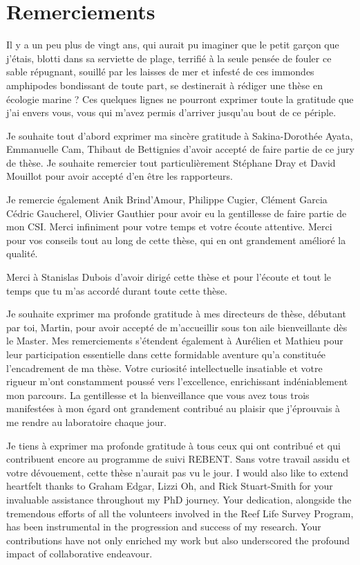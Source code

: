 \begin{refsection}

\hypertarget{remerciements}{%
\chapter*{Remerciements}\label{remerciements}}

Il y a un peu plus de vingt ans, qui aurait pu imaginer que le petit
garçon que j'étais, blotti dans sa serviette de plage, terrifié à la
seule pensée de fouler ce sable répugnant, souillé par les laisses de
mer et infesté de ces immondes amphipodes bondissant de toute part, se
destinerait à rédiger une thèse en écologie marine ? Ces quelques lignes
ne pourront exprimer toute la gratitude que j'ai envers vous, vous qui
m'avez permis d'arriver jusqu'au bout de ce périple.

Je souhaite tout d'abord exprimer ma sincère gratitude à Sakina-Dorothée
Ayata, Emmanuelle Cam, Thibaut de Bettignies d'avoir accepté de faire
partie de ce jury de thèse. Je souhaite remercier tout particulièrement
Stéphane Dray et David Mouillot pour avoir accepté d'en être les
rapporteurs.

Je remercie également Anik Brind'Amour, Philippe Cugier, Clément Garcia
Cédric Gaucherel, Olivier Gauthier pour avoir eu la gentillesse de faire
partie de mon CSI. Merci infiniment pour votre temps et votre écoute
attentive. Merci pour vos conseils tout au long de cette thèse, qui en
ont grandement amélioré la qualité.

Merci à Stanislas Dubois d'avoir dirigé cette thèse et pour l'écoute et
tout le temps que tu m'as accordé durant toute cette thèse.

Je souhaite exprimer ma profonde gratitude à mes directeurs de thèse,
débutant par toi, Martin, pour avoir accepté de m'accueillir sous ton
aile bienveillante dès le Master. Mes remerciements s'étendent également
à Aurélien et Mathieu pour leur participation essentielle dans cette
formidable aventure qu'a constituée l'encadrement de ma thèse. Votre
curiosité intellectuelle insatiable et votre rigueur m'ont constamment
poussé vers l'excellence, enrichissant indéniablement mon parcours. La
gentillesse et la bienveillance que vous avez tous trois manifestées à
mon égard ont grandement contribué au plaisir que j'éprouvais à me
rendre au laboratoire chaque jour.

Je tiens à exprimer ma profonde gratitude à tous ceux qui ont contribué
et qui contribuent encore au programme de suivi REBENT. Sans votre
travail assidu et votre dévouement, cette thèse n'aurait pas vu le jour.
I would also like to extend heartfelt thanks to Graham Edgar, Lizzi Oh,
and Rick Stuart-Smith for your invaluable assistance throughout my PhD
journey. Your dedication, alongside the tremendous efforts of all the
volunteers involved in the Reef Life Survey Program, has been
instrumental in the progression and success of my research. Your
contributions have not only enriched my work but also underscored the
profound impact of collaborative endeavour.


\end{refsection}
